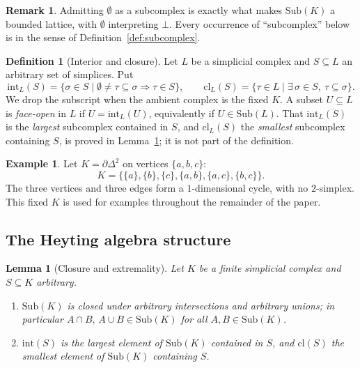 \documentclass[final,12pt]{elsarticle}
\theoremstyle{plain}
\newtheorem{lem}[thm]{Lemma}
\theoremstyle{definition}
\newtheorem{defi}[thm]{Definition}
\newtheorem{exa}[thm]{Example}
\newtheorem{rem}[thm]{Remark}
\begin{document}
\begin{rem}
\label{rem:empty-subcomplex}
Admitting \(\emptyset\) as a subcomplex is exactly what makes \(\mathrm{Sub}(K)\)
a bounded lattice, with \(\emptyset\) interpreting \(\bot\). Every occurrence of
``subcomplex'' below is in the sense of Definition~\ref{def:subcomplex}.
\end{rem}

\begin{defi}[Interior and closure]
\label{def:interior-closure}
Let \(L\) be a simplicial complex and \(S \subseteq L\) an arbitrary set of
simplices. Put
\[
\mathrm{int}_L(S) = \{\sigma \in S \mid \emptyset \neq \tau \subseteq \sigma
\Rightarrow \tau \in S\},
\qquad
\mathrm{cl}_L(S) = \{\tau \in L \mid \exists\, \sigma \in S,\ \tau \subseteq \sigma\}.
\]
We drop the subscript when the ambient complex is the fixed \(K\). A subset
\(U \subseteq L\) is \emph{face-open} in \(L\) if \(U = \mathrm{int}_L(U)\),
equivalently if \(U \in \mathrm{Sub}(L)\). That \(\mathrm{int}_L(S)\) is the
\emph{largest} subcomplex contained in \(S\), and \(\mathrm{cl}_L(S)\) the
\emph{smallest} subcomplex containing \(S\), is proved in
Lemma~\ref{lem:subcomplex-closure}; it is not part of the definition.
\end{defi}

\begin{exa}
\label{ex:boundary-triangle}
Let \(K = \partial\Delta^2\) on vertices \(\{a,b,c\}\):
\[
K = \bigl\{\{a\},\{b\},\{c\},\{a,b\},\{a,c\},\{b,c\}\bigr\}.
\]
The three vertices and three edges form a \(1\)-dimensional cycle, with no
\(2\)-simplex. This fixed \(K\) is used for examples throughout the remainder of
the paper.
\end{exa}

\subsection{The Heyting algebra structure}
\label{subsec:heyting-algebra}

\begin{lem}[Closure and extremality]
\label{lem:subcomplex-closure}
Let \(K\) be a finite simplicial complex and \(S \subseteq K\) arbitrary.
\begin{enumerate}
\item \(\mathrm{Sub}(K)\) is closed under arbitrary intersections and arbitrary
      unions; in particular \(A \cap B,\, A \cup B \in \mathrm{Sub}(K)\) for all
      \(A,B \in \mathrm{Sub}(K)\).
\item \(\mathrm{int}(S)\) is the largest element of \(\mathrm{Sub}(K)\) contained
      in \(S\), and \(\mathrm{cl}(S)\) the smallest element of \(\mathrm{Sub}(K)\)
      containing \(S\).
\end{enumerate}
\end{lem}
\end{document}
